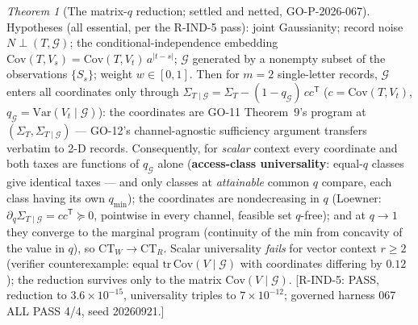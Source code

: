 ﻿\documentclass[11pt]{article}
\theoremstyle{remark}
\begin{document}
\newtheorem{theorem}{Theorem}
\begin{theorem}[The matrix-$q$ reduction; settled and netted,
GO-P-2026-067]\label{thm:matq}
Hypotheses (all essential, per the R-IND-5 pass): joint
Gaussianity; record noise $N\perp(T,\mathcal G)$; the
conditional-independence embedding $\mathrm{Cov}(T,V_s)=
\mathrm{Cov}(T,V_t)\,a^{|t-s|}$; $\mathcal G$ generated by a nonempty
subset of the observations $\{S_s\}$; weight $w\in[0,1]$. Then for
$m=2$ single-letter records, $\mathcal G$ enters all coordinates only
through $\Sigma_{T\mid\mathcal G}=\Sigma_T-(1-q_{\mathcal G})\,
cc^{\mathsf T}$ ($c=\mathrm{Cov}(T,V_t)$, $q_{\mathcal G}=
\mathrm{Var}(V_t\mid\mathcal G)$): the coordinates are GO-11
Theorem~9's program at $(\Sigma_T,\Sigma_{T\mid\mathcal G})$ ---
GO-12's channel-agnostic sufficiency argument transfers verbatim to
2-D records. Consequently, for \emph{scalar} context every coordinate
and both taxes are functions of $q_{\mathcal G}$ alone
(\textbf{access-class universality}: equal-$q$ classes give identical
taxes --- and only classes at \emph{attainable} common $q$ compare,
each class having its own $q_{\min}$); the coordinates are
nondecreasing in $q$ (Loewner: $\partial_q\Sigma_{T\mid\mathcal G}
=cc^{\mathsf T}\succeq0$, pointwise in every channel, feasible set
$q$-free); and at $q\to1$ they converge to the marginal program
(continuity of the min from concavity of the value in $q$), so
$\mathrm{CT}_W\to\mathrm{CT}_R$. Scalar universality \emph{fails} for
vector context $r\ge2$ (verifier counterexample: equal
$\mathrm{tr}\,\mathrm{Cov}(V\mid\mathcal G)$ with coordinates
differing by $0.12$); the reduction survives only to the matrix
$\mathrm{Cov}(V\mid\mathcal G)$. [R-IND-5: PASS, reduction to
$3.6\times10^{-15}$, universality triples to $7\times10^{-12}$;
governed harness 067 ALL PASS 4/4, seed 20260921.]
\end{theorem}
\end{document}
